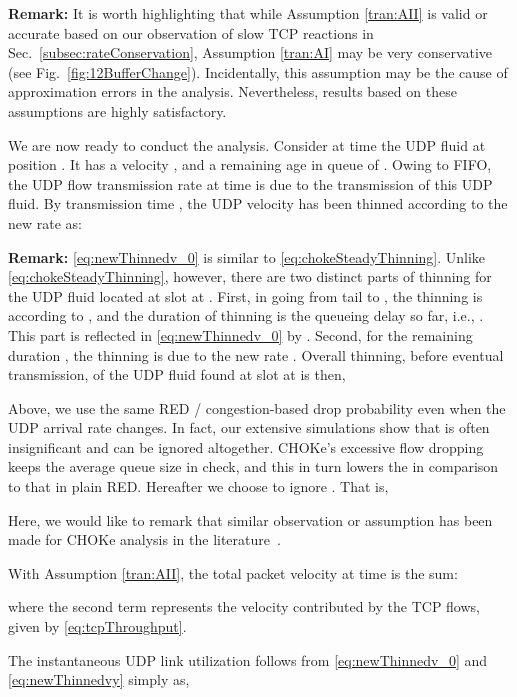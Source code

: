 \documentclass{IEEEtran}
\begin{document}
    {\bf Remark:} It is worth highlighting that while Assumption \ref{tran:AII} is valid or accurate based on our observation of slow TCP reactions in Sec.~\ref{subsec:rateConservation}, Assumption \ref{tran:AI} may be very conservative (see Fig.~\ref{fig:12BufferChange}). Incidentally, this assumption may be the cause of approximation errors in the analysis. Nevertheless, results based on these assumptions are highly satisfactory.


\vspace{5mm}

   We are now ready to conduct the analysis. Consider at time  the UDP fluid at position . It has a velocity , and a remaining age in queue of . Owing to FIFO, the UDP flow transmission rate at time  is due to the transmission of this UDP fluid. By transmission time , the UDP velocity has been thinned according to the new rate  as:


{\bf Remark:} \eqref{eq:newThinnedv_0} is similar to \eqref{eq:chokeSteadyThinning}. Unlike \eqref{eq:chokeSteadyThinning}, however, there are two distinct parts of thinning for the UDP fluid located at slot  at . First, in going from tail to , the thinning is according to , and the duration of thinning is the queueing delay so far, i.e., .  This part is reflected in \eqref{eq:newThinnedv_0}  by . Second, for the remaining duration , the thinning is due to the new rate . Overall thinning, before eventual transmission, of the UDP fluid found at slot   at  is then,


Above, we use the same RED / congestion-based drop probability  even when the UDP arrival rate changes. In fact, our extensive simulations show that   is often insignificant and can be ignored altogether. CHOKe's excessive flow dropping keeps the average queue size  in check, and this in turn lowers the  in comparison to that in plain RED. Hereafter we choose to ignore . That is,
     
Here, we would like to remark that similar observation or assumption has been made for CHOKe analysis in the literature~\cite{ChokeSigmetrics03}.

    With Assumption \ref{tran:AII}, the total packet velocity  at time  is the sum:
    
where the second term represents the velocity contributed by the TCP flows, given by \eqref{eq:tcpThroughput}.

The instantaneous UDP link utilization  follows from \eqref{eq:newThinnedv_0} and \eqref{eq:newThinnedvy} simply as,
    
\end{document}

